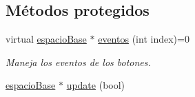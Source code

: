 \subsection*{Métodos protegidos}
\begin{DoxyCompactItemize}
\item 
virtual \hyperlink{classespacio_base}{espacio\+Base} $\ast$ \hyperlink{classmenu_base_a5a88a45efd3bc47b4731fb21749a97d5}{eventos} (int index)=0
\begin{DoxyCompactList}\small\item\em Maneja los eventos de los botones. \end{DoxyCompactList}\item 
\hyperlink{classespacio_base}{espacio\+Base} $\ast$ \hyperlink{classmenu_base_a9d5a46d7ecfa671591e547213a2bdd83}{update} (bool)
\end{DoxyCompactItemize}

